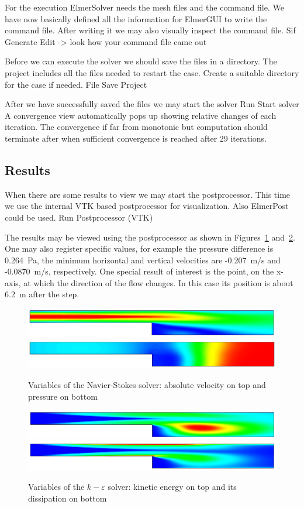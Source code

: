 For the execution 
ElmerSolver needs the mesh files and the command file. We have now basically defined
all the information for ElmerGUI to write the command file. After writing it we may also visually 
inspect the command file.
\ttbegin
Sif 
  Generate
  Edit -> look how your command file came out  
\ttend

Before we can execute the solver we should save the files in a directory. The project includes
all the files needed to restart the case. Create a suitable directory for the case if needed. 
\ttbegin
File 
  Save Project
\ttend

After we have successfully saved the files we may start the solver
\ttbegin
Run
  Start solver
\ttend
A convergence view automatically pops up showing relative changes of each iteration.
The convergence if far from monotonic but computation should terminate 
after when sufficient convergence is reached after 29 iterations.


\subsection*{Results}

When there are some results to view we may start the postprocessor. This time we use the 
internal VTK based postprocessor for visualization. Also ElmerPost could be used. 
\ttbegin
Run
  Postprocessor (VTK)
\ttend

The results may be viewed using the postprocessor as shown in 
Figures~\ref{fg:step_ns} and~\ref{fg:step_ke}.
One may also register specific values,
for example the pressure difference is 0.264~Pa, the minimum horizontal and vertical velocities
are -0.207~m/s and -0.0870~m/s, respectively.
One special result of interest 
is the point, on the x-axis, at which the direction of the flow changes. 
In this case its position is about 6.2~m after the step. 

\begin{figure}[h]
\centering
\includegraphics[width=15cm]{step_ke_velo}
\includegraphics[width=15cm]{step_ke_pres}
\caption{Variables of the Navier-Stokes solver: absolute velocity on top and 
pressure on bottom}\label{fg:step_ns}
\end{figure} 

\begin{figure}[h]
\centering
\includegraphics[width=15cm]{step_ke_kin}
\includegraphics[width=15cm]{step_ke_diss}
\caption{Variables of the $k-\varepsilon$ solver: kinetic energy on top and its dissipation on bottom}
\label{fg:step_ke}
\end{figure} 


\hfill
